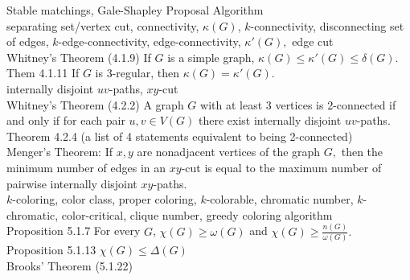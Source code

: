 \documentclass[12pt]{article}
\theoremstyle{homework}
\begin{document}
  Stable matchings, Gale-Shapley Proposal Algorithm\\

 separating set/vertex cut, connectivity, $\kappa(G)$, $k$-connectivity, disconnecting set of edges, $k$-edge-connectivity, edge-connectivity, $\kappa'(G),$ edge cut\\

Whitney's Theorem (4.1.9) If $G$ is a simple graph, $\kappa(G) \leq \kappa'(G) \leq \delta(G).$\\

Them 4.1.11 If $G$ is 3-regular, then $\kappa(G) = \kappa'(G).$\\

 internally disjoint $uv$-paths, $xy$-cut\\

Whitney's Theorem (4.2.2) A graph $G$ with at least 3 vertices is 2-connected if and only if for each pair $u,v \in V(G)$ there exist internally disjoint $uv$-paths.\\

Theorem 4.2.4 (a list of 4 statements equivalent to being 2-connected)\\

Menger's Theorem: If $x,y$ are nonadjacent vertices of the graph $G,$ then the minimum number of edges in an $xy$-cut is equal to the maximum number of pairwise internally disjoint $xy$-paths.\\

 $k$-coloring, color class, proper coloring, $k$-colorable, chromatic number, $k$-chromatic, color-critical, clique number, greedy coloring algorithm\\

Proposition 5.1.7 For every $G$, $\chi(G) \geq \omega(G)$ and $\chi(G) \geq \frac{n(G)}{\omega(G)}.$\\

Proposition 5.1.13 $\chi(G) \leq \Delta(G)$\\

Brooks' Theorem (5.1.22)\\
\end{document}
